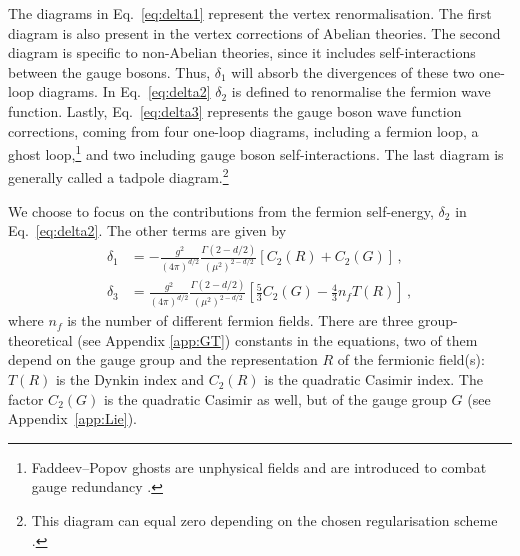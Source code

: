 The diagrams in Eq.~\eqref{eq:delta1} represent the vertex renormalisation. The first diagram is also present in the vertex corrections of Abelian theories. The second diagram is specific to non-Abelian theories, since it includes self-interactions between the gauge bosons. Thus, $\delta_1$ will absorb the divergences of these two one-loop diagrams. In Eq.~\eqref{eq:delta2} $\delta_2$ is defined to renormalise the fermion wave function. Lastly, Eq.~\eqref{eq:delta3} represents the gauge boson wave function corrections, coming from four one-loop diagrams, including a fermion loop, a ghost loop,\footnote{Faddeev--Popov ghosts are unphysical fields and are introduced to combat gauge redundancy \cite{Peskin:1995ev}.} and two including gauge boson self-interactions. The last diagram is generally called a tadpole diagram.\footnote{This diagram can equal zero depending on the chosen regularisation scheme \cite{Peskin:1995ev}.}

We choose to focus on the contributions from the fermion self-energy, $\delta_2$ in Eq.~\eqref{eq:delta2}. The other terms are given by \cite{Peskin:1995ev}
\begin{align}
   \delta_1 &= -\frac{g^2}{(4\pi)^{d/2}} \frac{\Gamma(2 - d/2)}{(\mu^2)^{2-d/2}} [C_2(R) + C_2(G)] \,,\label{eq:delta1expr}\\
   \delta_3& =\frac{g^2}{(4\pi)^{d/2}} \frac{\Gamma(2 - d/2)}{(\mu^2)^{2-d/2}} \left[ \frac{5}{3} C_2(G) - \frac{4}{3} n_f T(R) \right]\,,\label{eq:delta3expr} 
\end{align}
where $n_f$ is the number of different fermion fields. There are three group-theoretical (see Appendix \ref{app:GT}) constants in the equations, two of them depend on the gauge group and the representation $R$ of the fermionic field(s): $T(R)$ is the Dynkin index and $C_2(R)$ is the quadratic Casimir index. The factor $C_2(G)$ is the quadratic Casimir as well, but of the gauge group $G$ (see Appendix~\ref{app:Lie}).

